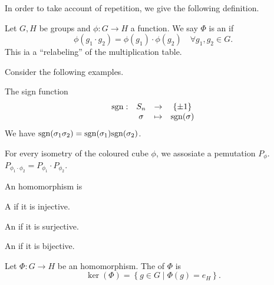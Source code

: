 In order to take account of repetition, we give the following definition.

\begin{definition}[Homomorphism]\label{def:homomorphism}
    Let $G, H$ be groups and $\phi: G \to H$ a function. We say $\Phi$ is an  if \[
        \phi(g_1 \cdot g_2) = \phi(g_1) \cdot \phi(g_2) \quad \forall g_1, g_2 \in G.
    \] This ia a ``relabeling'' of the multiplication table. 
\end{definition}

\begin{example}
    Consider the following examples.

    \begin{listu}
        \item The sign function \[ \begin{matrix}
            \mathrm{sgn}: & S_n & \to     & \{\pm 1\} \\
            & \sigma    & \mapsto & \mathrm{sgn}(\sigma)
        \end{matrix} \] We have $\mathrm{sgn}(\sigma_1 \sigma_2) = \mathrm{sgn}(\sigma_1) \mathrm{sgn}(\sigma_2)$.

        \item For every isometry of the coloured cube $\phi$, we assosiate a pemutation $P_\phi$. $P_{\phi_1 \cdot \phi_2} = P_{\phi_1} \cdot P_{\phi_2}$.
    \end{listu}
\end{example}

\begin{definition}\label{def:mono_epi_iso}
    An homomorphism is 

    \begin{listu}
        \item A  if it is injective.
        \item An  if it is surjective.
        \item An  if it is bijective.
    \end{listu}
\end{definition}

\begin{definition}[Kernel]\label{def:kernel}
    Let $\Phi: G \to H$ be an homomorphism. The  of $\Phi$ is \[
        \ker(\Phi) = \left\{ g \in G \mid \Phi(g) = e_H \right\}.
    \]
\end{definition}

